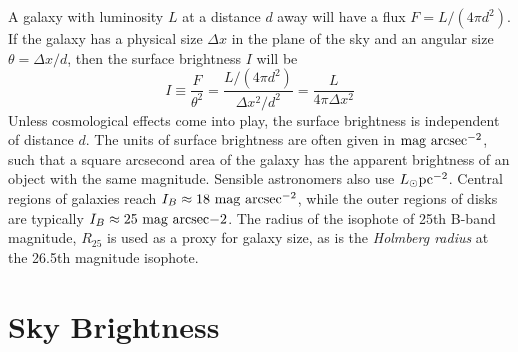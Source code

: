 \documentclass[]{article}
\begin{document}
A galaxy with luminosity $L$ at a distance $d$ away will have
a flux $F = L/(4\pi d^2)$. If the galaxy has a physical
size $\Delta x$ in the plane of the sky and an angular
size $\theta = \Delta x/d$, then the surface brightness
$I$ will be
\begin{equation}
I \equiv \frac{F}{\theta^{2}} = \frac{L/(4\pi d^2)}{\Delta x^2 / d^2} = \frac{L}{4\pi\Delta x^2}
\end{equation}
\noindent
Unless cosmological effects come into play, the surface brightness
is independent of distance $d$. The units of surface brightness are
often given in $\mathrm{mag}~\mathrm{arcsec}^{-2}$, such that a square arcsecond area
of the galaxy has the apparent brightness of an object with the
same magnitude. Sensible astronomers also use $L_{\odot}\mathrm{pc}^{-2}$. Central
regions of galaxies reach $I_{B}\approx 18~\mathrm{mag}~\mathrm{arcsec}^{-2}$, while
the outer regions of disks are typically $I_{B}\approx25~\mathrm{mag}~\mathrm{arcsec}{-2}$.
The radius of the isophote of 25th B-band magnitude, $R_{25}$ is used as
a proxy for galaxy size, as is the {\it Holmberg radius} at the 26.5th
magnitude isophote.

\section{Sky Brightness}
\end{document}
